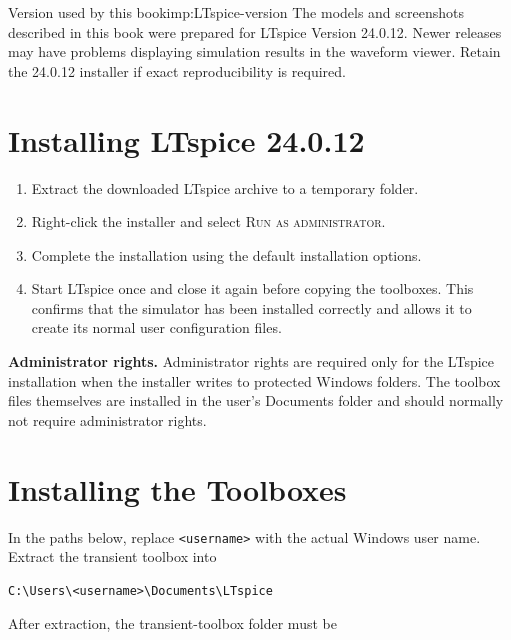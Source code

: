 \begin{important}{Version used by this book}{imp:LTspice-version}
The models and screenshots described in this book were prepared for LTspice
Version 24.0.12. Newer releases may have problems displaying simulation results
in the waveform viewer. Retain the 24.0.12 installer
if exact reproducibility is required.
\end{important}

\section{Installing LTspice 24.0.12}
\label{sec:installing-LTspice}

\begin{enumerate}
\item Extract the downloaded LTspice archive to a temporary folder.
\item Right-click the installer and select \textsc{Run as administrator}.
\item Complete the installation using the default installation options.
\item Start LTspice once and close it again before copying the toolboxes. This
      confirms that the simulator has been installed correctly and allows it
      to create its normal user configuration files.
\end{enumerate}

\begin{noteBox}
\textbf{Administrator rights.}
Administrator rights are required only for the LTspice installation when the
installer writes to protected Windows folders. The toolbox files themselves
are installed in the user's Documents folder and should normally not require
administrator rights.
\end{noteBox}

\section{Installing the Toolboxes}
\label{sec:installing-power-system-toolboxes}

In the paths below, replace \texttt{<username>} with the actual Windows user
name. Extract the transient toolbox into

\begin{lstlisting}[style=PlainText]
C:\Users\<username>\Documents\LTspice
\end{lstlisting}

After extraction, the transient-toolbox folder must be


